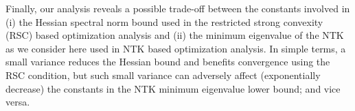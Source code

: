 Finally, our analysis  reveals a possible trade-off between the constants involved in (i) the Hessian spectral norm bound used in the  restricted strong convexity (RSC) based optimization analysis   and (ii) the minimum eigenvalue of the NTK as we consider here used in NTK based optimization analysis. In simple terms, a small variance reduces the Hessian bound and benefits convergence using the RSC condition,  
but such small variance can adversely affect (exponentially decrease) the constants in the NTK minimum eigenvalue lower bound; and vice versa.
